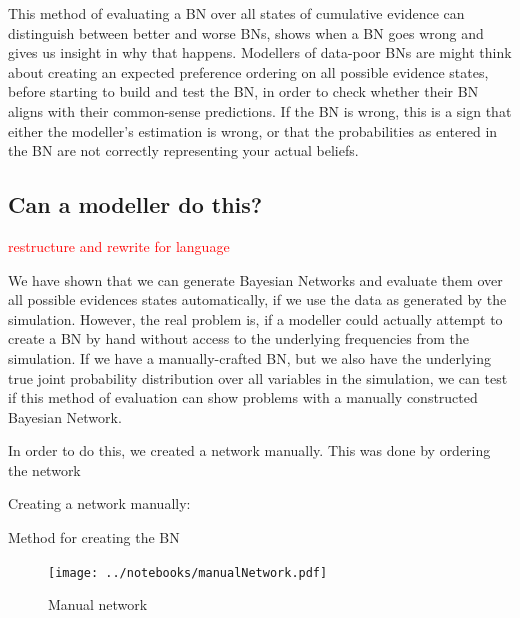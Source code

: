 \documentclass[12pt]{article}
\begin{document}
This method of evaluating a BN over all states of cumulative evidence can distinguish between better and worse BNs, shows when a BN goes wrong and gives us insight in why that happens. Modellers of data-poor BNs are might think about creating an expected preference ordering on all possible evidence states, before starting to build and test the BN, in order to check whether their BN aligns with their common-sense predictions. If the BN is wrong, this is a sign that either the modeller's estimation is wrong, or that the probabilities as entered in the BN are not correctly representing your actual beliefs.


\subsection{Can a modeller do this?}

 \textcolor{red} {restructure and rewrite for language}


We have shown that we can generate Bayesian Networks and evaluate them over all possible evidences states automatically, if we use the data as generated by the simulation. However, the real problem is, if a modeller could actually attempt to create a BN by hand without access to the underlying frequencies from the simulation. If we have a manually-crafted BN, but we also have the underlying true joint probability distribution over all variables in the simulation, we can test if this method of evaluation can show problems with a manually constructed Bayesian Network.

In order to do this, we created a network manually. This was done by ordering the network 
 
 Creating a network manually:
 
 Method for creating the BN
 
 
 
 \begin{figure}[htbp]
\begin{center}
\texttt{[image: ../notebooks/manualNetwork.pdf]}
\caption{Manual network}
\label{ }
\end{center}
\end{figure}

\newpage
\end{document}
